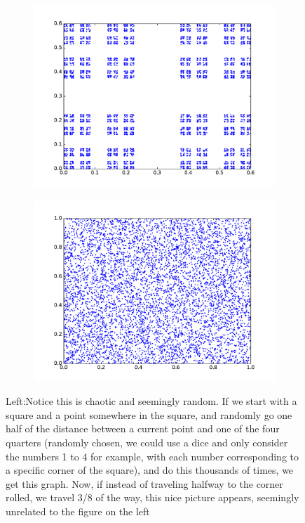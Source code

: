 \documentclass[12pt,twoside]{book}
\begin{document}
\begin{figure}[ht]
	\centering
	\begin{subfigure}{.5\textwidth}
		\centering
		\includegraphics[scale=.35]{chaos2}
		\label{fig:chaos2}
	\end{subfigure}%
	\begin{subfigure}{.5\textwidth}
		\centering
		\includegraphics[scale=0.35]{chaos1}
		
	\end{subfigure}
	\caption{Left:Notice this is chaotic and seemingly random.  If we start with a square and a point somewhere in the square, and randomly go one half of the distance between a current point and one of the four quarters (randomly chosen, we could use a dice and only consider the numbers 1 to 4 for example, with each number corresponding to a specific corner of the square), and do this thousands of times, we get this graph.  Now, if instead of traveling halfway to the corner rolled, we travel 3/8 of the way, this nice picture appears, seemingly unrelated to the figure on the left}

	\label{fig:chaos1}
\end{figure}
\end{document}
